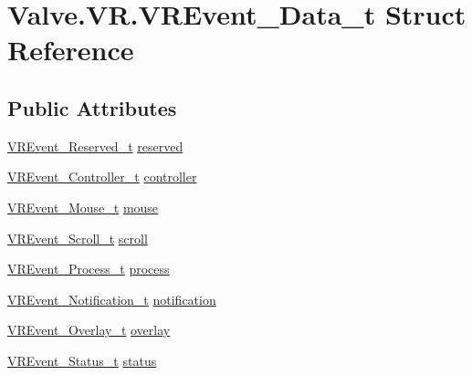 \hypertarget{struct_valve_1_1_v_r_1_1_v_r_event___data__t}{}\section{Valve.\+V\+R.\+V\+R\+Event\+\_\+\+Data\+\_\+t Struct Reference}
\label{struct_valve_1_1_v_r_1_1_v_r_event___data__t}
\subsection*{Public Attributes}
\begin{DoxyCompactItemize}
\item 
\mbox{\hyperlink{struct_valve_1_1_v_r_1_1_v_r_event___reserved__t}{V\+R\+Event\+\_\+\+Reserved\+\_\+t}} \mbox{\hyperlink{struct_valve_1_1_v_r_1_1_v_r_event___data__t_ab647742758ac002f6c9204765c4d4714}{reserved}}
\item 
\mbox{\hyperlink{struct_valve_1_1_v_r_1_1_v_r_event___controller__t}{V\+R\+Event\+\_\+\+Controller\+\_\+t}} \mbox{\hyperlink{struct_valve_1_1_v_r_1_1_v_r_event___data__t_a3f176cf4ef3de2085f0b1a0bf7549af1}{controller}}
\item 
\mbox{\hyperlink{struct_valve_1_1_v_r_1_1_v_r_event___mouse__t}{V\+R\+Event\+\_\+\+Mouse\+\_\+t}} \mbox{\hyperlink{struct_valve_1_1_v_r_1_1_v_r_event___data__t_ae41f91a56f91c5f4de3a79a8b264bff1}{mouse}}
\item 
\mbox{\hyperlink{struct_valve_1_1_v_r_1_1_v_r_event___scroll__t}{V\+R\+Event\+\_\+\+Scroll\+\_\+t}} \mbox{\hyperlink{struct_valve_1_1_v_r_1_1_v_r_event___data__t_a8656c16f4bad1786b529fb38b12383af}{scroll}}
\item 
\mbox{\hyperlink{struct_valve_1_1_v_r_1_1_v_r_event___process__t}{V\+R\+Event\+\_\+\+Process\+\_\+t}} \mbox{\hyperlink{struct_valve_1_1_v_r_1_1_v_r_event___data__t_acbb12d920d5408cbd61c91e86d0f2328}{process}}
\item 
\mbox{\hyperlink{struct_valve_1_1_v_r_1_1_v_r_event___notification__t}{V\+R\+Event\+\_\+\+Notification\+\_\+t}} \mbox{\hyperlink{struct_valve_1_1_v_r_1_1_v_r_event___data__t_adc46cffe8a73b8163c0f49145955b8a0}{notification}}
\item 
\mbox{\hyperlink{struct_valve_1_1_v_r_1_1_v_r_event___overlay__t}{V\+R\+Event\+\_\+\+Overlay\+\_\+t}} \mbox{\hyperlink{struct_valve_1_1_v_r_1_1_v_r_event___data__t_af5e48678550a77dfe06160dc2d87d8bf}{overlay}}
\item 
\mbox{\hyperlink{struct_valve_1_1_v_r_1_1_v_r_event___status__t}{V\+R\+Event\+\_\+\+Status\+\_\+t}} \mbox{\hyperlink{struct_valve_1_1_v_r_1_1_v_r_event___data__t_a3cdbab1a25ab7249dbabb88dfdb5b9c2}{status}}

\end{DoxyCompactItemize}
